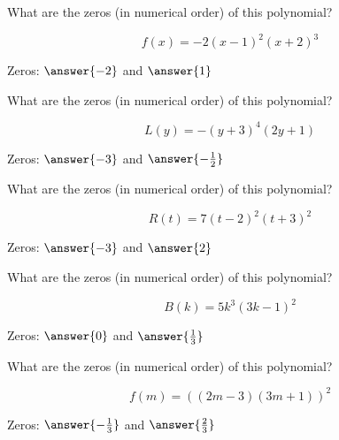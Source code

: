 \documentclass{ximera}
\author{Lee Wayand}
\begin{document}
\begin{exercise}








\begin{question}


What are the zeros (in numerical order) of this polynomial?

\[
f(x) = -2(x-1)^2(x+2)^3
\]


Zeros:  $\answer{-2}$ and $\answer{1}$

\end{question}





\begin{question}


What are the zeros (in numerical order) of this polynomial?

\[
L(y) = -(y+3)^4(2y+1)
\]

Zeros:  $\answer{-3}$ and $\answer{-\frac{1}{2}}$

\end{question}





\begin{question}


What are the zeros (in numerical order) of this polynomial?

\[
R(t) = 7(t-2)^2(t+3)^2
\]

Zeros:  $\answer{-3}$ and $\answer{2}$

\end{question}





\begin{question}


What are the zeros (in numerical order) of this polynomial?

\[
B(k) =  5k^3 (3k - 1)^2
\]

Zeros:  $\answer{0}$ and $\answer{\frac{1}{3}}$

\end{question}








\begin{question}


What are the zeros (in numerical order) of this polynomial?

\[
f(m) = ((2m - 3)(3m + 1))^2
\]

Zeros:  $\answer{-\frac{1}{3}}$ and $\answer{\frac{2}{3}}$

\end{question}












\end{exercise}
\end{document}
